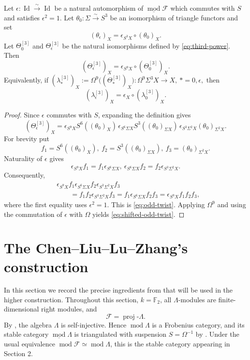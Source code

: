 \documentclass[12pt, twoside]{article}
\numberwithin{equation}{section}
\begin{document}
\begin{lemma}\label{lem:odd-twist}
Let $\epsilon:\operatorname{Id}\xrightarrow{\sim}\operatorname{Id}$ be a natural automorphism of $\underline{\operatorname{mod}}\mathcal F$ which commutes with $S$ and satisfies $\epsilon^2=1$. Let $\theta_0:\Sigma\xrightarrow{\sim}S^3$ be an isomorphism of triangle functors and set
\[
(\theta_\epsilon)_X=\epsilon_{S^3X}\circ(\theta_0)_X.
\]
Let $\Theta_0^{[3]}$ and $\Theta_\epsilon^{[3]}$ be the natural isomorphisms defined by \eqref{eq:third-power}. Then
\begin{equation}\label{eq:odd-twist}
(\Theta_\epsilon^{[3]})_X
=\epsilon_{S^9X}\circ(\Theta_0^{[3]})_X.
\end{equation}
Equivalently, if
$
(\lambda_*^{[3]})_X
:=\Omega^9\bigl((\Theta_*^{[3]})_X\bigr):
\Omega^9\Sigma^3X\longrightarrow X,
~ *=0,\epsilon,
$
then
\begin{equation}\label{eq:shifted-odd-twist}
(\lambda_\epsilon^{[3]})_X
=\epsilon_X\circ(\lambda_0^{[3]})_X.
\end{equation}
\end{lemma}

\begin{proof}
Since $\epsilon$ commutes with $S$, expanding the definition gives
\[
(\Theta_\epsilon^{[3]})_X
=\epsilon_{S^9X}S^6((\theta_0)_X)\,
\epsilon_{S^6\Sigma X}S^3((\theta_0)_{\Sigma X})\,
\epsilon_{S^3\Sigma^2X}(\theta_0)_{\Sigma^2X}.
\]
For brevity put
\[
f_1=S^6((\theta_0)_X),~
f_2=S^3((\theta_0)_{\Sigma X}),~
f_3=(\theta_0)_{\Sigma^2X}.
\]
Naturality of $\epsilon$ gives
\[
\epsilon_{S^9X}f_1=f_1\epsilon_{S^6\Sigma X},
~
\epsilon_{S^6\Sigma X}f_2=f_2\epsilon_{S^3\Sigma^2X}.
\]
Consequently,
\[
\begin{aligned}
&\epsilon_{S^9X}f_1\epsilon_{S^6\Sigma X}f_2
\epsilon_{S^3\Sigma^2X}f_3\\
&\qquad =f_1f_2\epsilon_{S^3\Sigma^2X}f_3
=f_1\epsilon_{S^6\Sigma X}f_2f_3
=\epsilon_{S^9X}f_1f_2f_3,
\end{aligned}
\]
where the first equality uses $\epsilon^2=1$. This is \eqref{eq:odd-twist}. Applying $\Omega^9$ and using the commutation of $\epsilon$ with $\Omega$ yields \eqref{eq:shifted-odd-twist}.
\end{proof}


\section{The Chen--Liu--Lu--Zhang's construction}

In this section we record the precise ingredients from \cite{CLLZ} that will be used in the higher construction. Throughout this section, $k=\mathbb F_2$, all $\Lambda$-modules are finite-dimensional right modules, and
\[
\mathcal F=\operatorname{proj}\text{-}\Lambda.
\]
By \cite[Proposition 3.1]{CLLZ}, the algebra $\Lambda$ is self-injective. Hence $\operatorname{mod}\Lambda$ is a Frobenius category, and its stable category $\underline{\operatorname{mod}}\Lambda$ is triangulated with suspension $S=\Omega^{-1}$ by \cite[Theorem 2.6]{H}. Under the usual equivalence $\operatorname{mod}\mathcal F\simeq\operatorname{mod}\Lambda$, this is the stable category appearing in Section 2.
\end{document}
